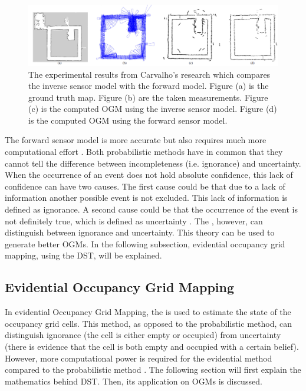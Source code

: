 \begin{figure}[h!]
	\centering
	\includegraphics[width=1\linewidth]{Figures/Occupancy_Grid_Map/OGM_inverse_forward_compare}
	\caption{The experimental results from Carvalho's research \cite{carvalho2013comparative} which compares the inverse sensor model with the forward model. Figure (a) is the ground truth map. Figure (b) are the taken measurements. Figure (c) is the computed \gls{OGM} using the inverse sensor model. Figure (d) is the computed \gls{OGM} using the forward sensor model.}
	\label{fig:OGM_inv_for_comp}
\end{figure}

The forward sensor model is more accurate but also requires much more computational effort \cite{carvalho2013comparative}. Both probabilistic methods have in common that they cannot tell the difference between incompleteness (i.e. ignorance) and uncertainty. When the occurrence of an event does not hold absolute confidence, this lack of confidence can have two causes. The first cause could be that due to a lack of information another possible event is not excluded. This lack of information is defined as ignorance. A second cause could be that the occurrence of the event is not definitely true, which is defined as uncertainty \cite{liu2001propositional}.
The  \cite{dempster1967upper} \cite{shafer1976mathematical}, however, can distinguish between ignorance and uncertainty. This theory can be used to generate better \glspl{OGM}. In the following subsection, evidential occupancy grid mapping, using the \gls{DST}, will be explained.


\subsection{Evidential Occupancy Grid Mapping} \label{subsec:evid_OGM}
In evidential Occupancy Grid Mapping, the  is used to estimate the state of the occupancy grid cells. This method, as opposed to the probabilistic method, can distinguish ignorance (the cell is either empty or occupied) from uncertainty (there is evidence that the cell is both empty and occupied with a certain belief). However, more computational power is required for the evidential method compared to the probabilistic method \cite{moras2014evidential}. The following section will first explain the mathematics behind \gls{DST}. Then, its application on \glspl{OGM} is discussed. 


